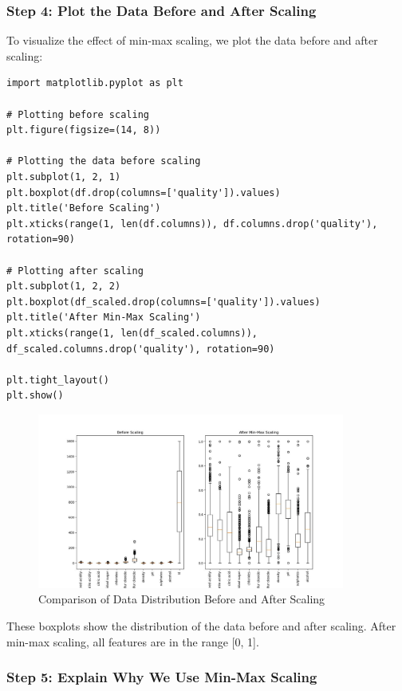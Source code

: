 \documentclass{exam}
\begin{document}
\newpage

\subsubsection{Step 4: Plot the Data Before and After Scaling}

To visualize the effect of min-max scaling, we plot the data before and after scaling:

\begin{verbatim}
import matplotlib.pyplot as plt

# Plotting before scaling
plt.figure(figsize=(14, 8))

# Plotting the data before scaling
plt.subplot(1, 2, 1)
plt.boxplot(df.drop(columns=['quality']).values)
plt.title('Before Scaling')
plt.xticks(range(1, len(df.columns)), df.columns.drop('quality'), rotation=90)

# Plotting after scaling
plt.subplot(1, 2, 2)
plt.boxplot(df_scaled.drop(columns=['quality']).values)
plt.title('After Min-Max Scaling')
plt.xticks(range(1, len(df_scaled.columns)), df_scaled.columns.drop('quality'), rotation=90)

plt.tight_layout()
plt.show()
\end{verbatim}

\begin{figure}[h!]
    \centering
    \includegraphics[width=0.9\textwidth]{images/scaling_comparison_plot.jpg}
    \caption{Comparison of Data Distribution Before and After Scaling}
    \label{fig:scaling_comparison}
\end{figure}

These boxplots show the distribution of the data before and after scaling. After min-max scaling, all features are in the range [0, 1].

\subsubsection{Step 5: Explain Why We Use Min-Max Scaling}
\end{document}
